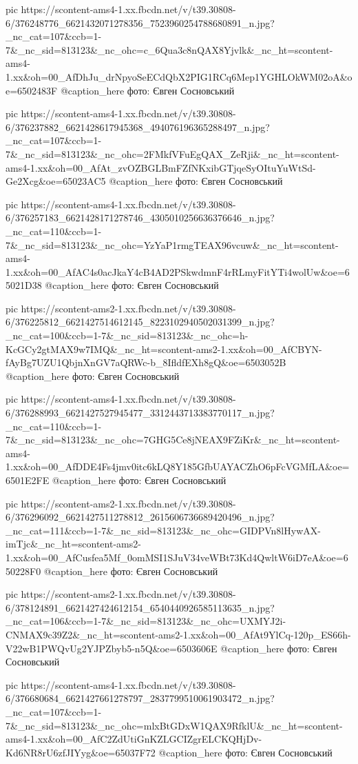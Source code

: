      pic https://scontent-ams4-1.xx.fbcdn.net/v/t39.30808-6/376248776_6621432071278356_7523960254788680891_n.jpg?_nc_cat=107&ccb=1-7&_nc_sid=813123&_nc_ohc=c_6Qua3c8nQAX8Yjvlk&_nc_ht=scontent-ams4-1.xx&oh=00_AfDhJu_drNpyoSeECdQbX2PIG1RCq6Mep1YGHLOkWM02oA&oe=6502483F
     @caption_here фото: Євген Сосновський

     pic https://scontent-ams4-1.xx.fbcdn.net/v/t39.30808-6/376237882_6621428617945368_494076196365288497_n.jpg?_nc_cat=107&ccb=1-7&_nc_sid=813123&_nc_ohc=2FMkfVFuEgQAX_ZeRji&_nc_ht=scontent-ams4-1.xx&oh=00_AfAt_zvOZBGLBmFZfNKxibGTjqeSyOItuYuWtSd-Ge2Xcg&oe=65023AC5
     @caption_here фото: Євген Сосновський

     pic https://scontent-ams4-1.xx.fbcdn.net/v/t39.30808-6/376257183_6621428171278746_4305010256636376646_n.jpg?_nc_cat=110&ccb=1-7&_nc_sid=813123&_nc_ohc=YzYaP1rmgTEAX96vcuw&_nc_ht=scontent-ams4-1.xx&oh=00_AfAC4s0acJkaY4cB4AD2PSkwdmnF4rRLmyFitYTi4wolUw&oe=65021D38
     @caption_here фото: Євген Сосновський

     pic https://scontent-ams2-1.xx.fbcdn.net/v/t39.30808-6/376225812_6621427514612145_8223102940502031399_n.jpg?_nc_cat=100&ccb=1-7&_nc_sid=813123&_nc_ohc=h-KcGCy2gtMAX9w7IMQ&_nc_ht=scontent-ams2-1.xx&oh=00_AfCBYN-fAyBg7UZU1QbjnXnGV7aQRWc-b_8IfldfEXh8gQ&oe=6503052B
     @caption_here фото: Євген Сосновський

     pic https://scontent-ams4-1.xx.fbcdn.net/v/t39.30808-6/376288993_6621427527945477_3312443713383770117_n.jpg?_nc_cat=110&ccb=1-7&_nc_sid=813123&_nc_ohc=7GHG5Ce8jNEAX9FZiKr&_nc_ht=scontent-ams4-1.xx&oh=00_AfDDE4Fs4jmv0itc6kLQ8Y185GfbUAYACZhO6pFcVGMfLA&oe=6501E2FE
     @caption_here фото: Євген Сосновський

     pic https://scontent-ams2-1.xx.fbcdn.net/v/t39.30808-6/376296092_6621427511278812_2615606736689420496_n.jpg?_nc_cat=111&ccb=1-7&_nc_sid=813123&_nc_ohc=GIDPVn8lHywAX-imTjc&_nc_ht=scontent-ams2-1.xx&oh=00_AfCusfea5Mf_0omMSI1SJuV34veWBt73Kd4QwltW6iD7eA&oe=650228F0
     @caption_here фото: Євген Сосновський

     pic https://scontent-ams2-1.xx.fbcdn.net/v/t39.30808-6/378124891_6621427424612154_6540440926585113635_n.jpg?_nc_cat=106&ccb=1-7&_nc_sid=813123&_nc_ohc=UXMYJ2i-CNMAX9c39Z2&_nc_ht=scontent-ams2-1.xx&oh=00_AfAt9YlCq-120p_ES66h-V22wB1PWQvUg2YJPZbyb5-n5Q&oe=6503606E
     @caption_here фото: Євген Сосновський

     pic https://scontent-ams4-1.xx.fbcdn.net/v/t39.30808-6/376680684_6621427661278797_2837799510061903472_n.jpg?_nc_cat=107&ccb=1-7&_nc_sid=813123&_nc_ohc=mlxBtGDxW1QAX9RfklU&_nc_ht=scontent-ams4-1.xx&oh=00_AfC2ZdUtiGnKZLGCIZgrELCKQHjDv-Kd6NR8rU6zfJIYyg&oe=65037F72
     @caption_here фото: Євген Сосновський

